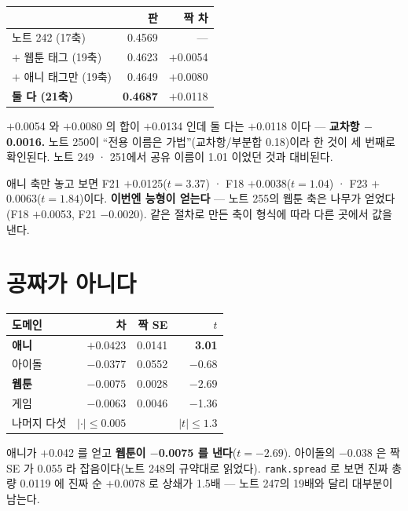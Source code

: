 \documentclass[10pt]{article}
\begin{document}
\begin{center}\small
\begin{tabular}{lrr}
\hline
 & 판 & 짝 차 \\
\hline
노트 242 (17축) & 0.4569 & --- \\
$+$ 웹툰 태그 (19축) & 0.4623 & $+$0.0054 \\
$+$ 애니 태그만 (19축) & 0.4649 & $+$0.0080 \\
\textbf{둘 다 (21축)} & \textbf{0.4687} & $+$0.0118 \\
\hline
\end{tabular}
\end{center}

$+$0.0054 와 $+$0.0080 의 합이 $+$0.0134 인데 둘 다는 $+$0.0118 이다 ---
\textbf{교차항 $-$0.0016.} 노트 250이 ``전용 이름은 가법''(교차항/부분합
0.18)이라 한 것이 세 번째로 확인된다. 노트 249 · 251에서 공유 이름이
1.01 이었던 것과 대비된다.

애니 축만 놓고 보면 F21 $+$0.0125($t{=}3.37$) · F18 $+$0.0038($t{=}1.04$) ·
F23 $+$0.0063($t{=}1.84$)이다. \textbf{이번엔 능형이 얻는다} --- 노트 255의
웹툰 축은 나무가 얻었다(F18 $+$0.0053, F21 $-$0.0020). 같은 절차로 만든
축이 형식에 따라 다른 곳에서 값을 낸다.

\section{공짜가 아니다}

\begin{center}\small
\begin{tabular}{lrrr}
\hline
도메인 & 차 & 짝 SE & $t$ \\
\hline
\textbf{애니} & $\mathbf{+0.0423}$ & 0.0141 & \textbf{3.01} \\
아이돌 & $-$0.0377 & 0.0552 & $-$0.68 \\
\textbf{웹툰} & $\mathbf{-0.0075}$ & 0.0028 & $\mathbf{-2.69}$ \\
게임 & $-$0.0063 & 0.0046 & $-$1.36 \\
나머지 다섯 & $|{\cdot}| \le 0.005$ & & $|t| \le 1.3$ \\
\hline
\end{tabular}
\end{center}

애니가 $+$0.042 를 얻고 \textbf{웹툰이 $-$0.0075 를 낸다}($t{=}-2.69$).
아이돌의 $-$0.038 은 짝 SE 가 0.055 라 잡음이다(노트 248의 규약대로 읽었다).
\texttt{rank.spread} 로 보면 진짜 총량 0.0119 에 진짜 순 $+$0.0078 로
상쇄가 1.5배 --- 노트 247의 19배와 달리 대부분이 남는다.
\end{document}
